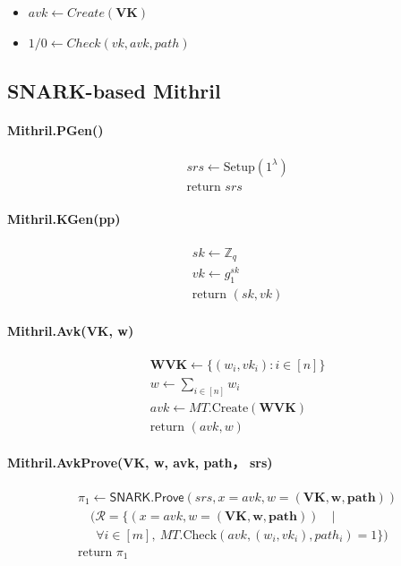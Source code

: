 \documentclass{article}
\begin{document}
\begin{itemize}
    \item $avk \leftarrow Create(\mathbf{VK})$
    \item $1/0 \leftarrow Check(vk,avk,path)$
\end{itemize}

\subsection{SNARK-based Mithril}

\paragraph{Mithril.PGen()}
\begin{align*}
&srs \leftarrow \text{Setup}(1^\lambda)\\
&\text{return } srs 
\end{align*}

\paragraph{Mithril.KGen(pp)}
\begin{align*}
&sk \leftarrow \mathbb{Z}_q \\
&vk \leftarrow g_1^{sk} \\
&\text{return } (sk, vk)
\end{align*}

\paragraph{Mithril.Avk(\textbf{VK}, \textbf{w})}
\begin{align*}
&\textbf{WVK} \leftarrow \{(w_i, vk_i) : i \in [n]\} \\
&w \leftarrow \sum_{i \in [n]} w_i\\
&avk \leftarrow MT.\mathrm{Create}(\textbf{WVK}) \\
&\text{return } (avk,w)
\end{align*}

\paragraph{Mithril.AvkProve(VK, w, avk, path， srs)}
\begin{align*}
&\pi_1 \leftarrow \mathsf{SNARK.Prove}(srs, x = avk, w = (\textbf{VK}, \textbf{w}, \textbf{path})) \\
&\quad (\mathcal{R} = \{(x = avk, w = (\textbf{VK}, \textbf{w}, \textbf{path}))\quad |\\ & \quad \ \ \forall i \in [m],\ MT.\mathrm{Check}(avk, (w_i, vk_i), path_i) = 1 \}) \\
&\text{return } \pi_1
\end{align*}
\end{document}

